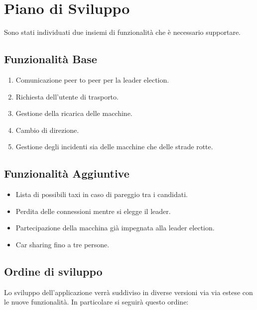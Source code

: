
\section{Piano di Sviluppo}

Sono stati individuati due insiemi di funzionalità che è necessario supportare.
\subsection{Funzionalità Base}

\begin{enumerate}
	\item Comunicazione peer to peer per la leader election.
	\item Richiesta dell'utente di trasporto.
	\item Gestione della ricarica delle macchine.
	\item Cambio di direzione.
	\item Gestione degli incidenti sia delle macchine che delle strade rotte.
\end{enumerate}

\subsection{Funzionalità Aggiuntive}

\begin{itemize}
	\item Lista di possibili taxi in caso di pareggio tra i candidati.
	\item Perdita delle connessioni mentre si elegge il leader.
	\item Partecipazione della macchina già impegnata alla leader election.
	\item Car sharing fino a tre persone.
\end{itemize}

\subsection{Ordine di sviluppo}
Lo sviluppo dell'applicazione verrà suddiviso in diverse versioni via via estese con le nuove funzionalità. In particolare si seguirà questo ordine:


